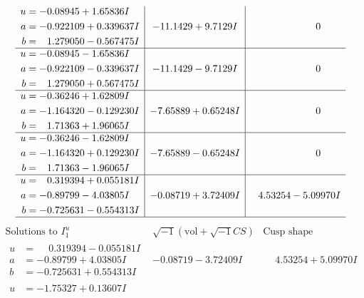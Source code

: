 \documentclass[1p]{elsarticle_modified}
\theoremstyle{definition}
\newcommand{\I}{\sqrt{-1}}
\begin{document}
$$\begin{array}{c|c|c}
\begin{aligned}
u &= -0.08945 + 1.65836 I \\
a &= -0.922109 + 0.339637 I \\
b &= \phantom{-}1.279050 - 0.567475 I\end{aligned}
 & -11.1429 + 9.7129 I & \phantom{-0.000000 } 0 \\ \hline\begin{aligned}
u &= -0.08945 - 1.65836 I \\
a &= -0.922109 - 0.339637 I \\
b &= \phantom{-}1.279050 + 0.567475 I\end{aligned}
 & -11.1429 - 9.7129 I & \phantom{-0.000000 } 0 \\ \hline\begin{aligned}
u &= -0.36246 + 1.62809 I \\
a &= -1.164320 - 0.129230 I \\
b &= \phantom{-}1.71363 + 1.96065 I\end{aligned}
 & -7.65889 + 0.65248 I & \phantom{-0.000000 } 0 \\ \hline\begin{aligned}
u &= -0.36246 - 1.62809 I \\
a &= -1.164320 + 0.129230 I \\
b &= \phantom{-}1.71363 - 1.96065 I\end{aligned}
 & -7.65889 - 0.65248 I & \phantom{-0.000000 } 0 \\ \hline\begin{aligned}
u &= \phantom{-}0.319394 + 0.055181 I \\
a &= -0.89799 - 4.03805 I \\
b &= -0.725631 - 0.554313 I\end{aligned}
 & -0.08719 + 3.72409 I & \phantom{-}4.53254 - 5.09970 I\\
 \hline 
 \end{array}$$\newpage$$\begin{array}{c|c|c}  
\text{Solutions to }I^u_{1}& \I (\text{vol} + \sqrt{-1}CS) & \text{Cusp shape}\\
 \hline 
\begin{aligned}
u &= \phantom{-}0.319394 - 0.055181 I \\
a &= -0.89799 + 4.03805 I \\
b &= -0.725631 + 0.554313 I\end{aligned}
 & -0.08719 - 3.72409 I & \phantom{-}4.53254 + 5.09970 I \\ \hline\begin{aligned}
u &= -1.75327 + 0.13607 I \\

\end{aligned}
\end{array}$$
\end{document}
